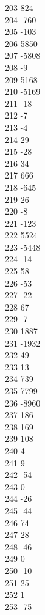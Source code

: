 { 203	824 \\
 204	-760 \\
 205	-103 \\
 206	5850 \\
 207	-5808 \\
 208	-9 \\
 209	5168 \\
 210	-5169 \\
 211	-18 \\
 212	-7 \\
 213	-4 \\
 214	29 \\
 215	-28 \\
 216	34 \\
 217	666 \\
 218	-645 \\
 219	26 \\
 220	-8 \\
 221	-123 \\
 222	5524 \\
 223	-5448 \\
 224	-14 \\
 225	58 \\
 226	-53 \\
 227	-22 \\
 228	67 \\
 229	-7 \\
 230	1887 \\
 231	-1932 \\
 232	49 \\
 233	13 \\
 234	739 \\
 235	7799 \\
 236	-8960 \\
 237	186 \\
 238	169 \\
 239	108 \\
 240	4 \\
 241	9 \\
 242	-54 \\
 243	0 \\
 244	-26 \\
 245	-44 \\
 246	74 \\
 247	28 \\
 248	-46 \\
 249	0 \\
 250	-10 \\
 251	25 \\
 252	1 \\
 253	-75 \\
}
